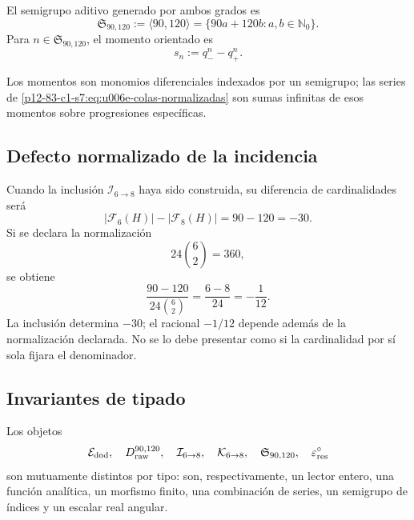 {\begin{definition}
\label{p12-83-c1-s7:def:u006e-semigrupo-momentos}
El semigrupo aditivo generado por ambos grados es
\begin{equation}
 \mathfrak S_{90,120}
 :=\langle90,120\rangle
 =\{90a+120b:a,b\in\mathbb N_0\}.
 \label{p12-83-c1-s7:eq:u006e-semigrupo}
\end{equation}
Para \(n\in\mathfrak S_{90,120}\), el momento orientado es
\begin{equation}
 s_n:=q_-^n-q_+^n.
 \label{p12-83-c1-s7:eq:u006e-momento}
\end{equation}
\end{definition}

Los momentos son monomios diferenciales indexados por un semigrupo; las
series de \eqref{p12-83-c1-s7:eq:u006e-colas-normalizadas} son sumas infinitas de esos
momentos sobre progresiones específicas.

\subsection{Defecto normalizado de la incidencia}

Cuando la inclusión \(\mathcal I_{6\to8}\) haya sido construida, su
diferencia de cardinalidades será
\[
 |\mathcal F_6(H)|-|\mathcal F_8(H)|=90-120=-30.
\]
Si se declara la normalización
\[
 24\binom62=360,
\]
se obtiene
\begin{equation}
 \frac{90-120}{24\binom62}
 =\frac{6-8}{24}
 =-\frac1{12}.
 \label{p12-83-c1-s7:eq:u006e-defecto-normalizado}
\end{equation}
La inclusión determina \(-30\); el racional \(-1/12\) depende además de
la normalización declarada. No se lo debe presentar como si la cardinalidad
por sí sola fijara el denominador.

\subsection{Invariantes de tipado}

\begin{theorem}
\label{p12-83-c1-s7:thm:u006e-separacion-seis-objetos}
Los objetos
\begin{equation}
 \mathcal E_{\rm dod},\quad
 D_{\rm raw}^{90,120},\quad
 \mathcal I_{6\to8},\quad
 \mathcal K_{6\to8},\quad
 \mathfrak S_{90,120},\quad
 \varepsilon_{\rm res}^{\circ}
 \label{p12-83-c1-s7:eq:u006e-seis-objetos}
\end{equation}
son mutuamente distintos por tipo: son, respectivamente, un lector entero,
una función analítica, un morfismo finito, una combinación de series, un
semigrupo de índices y un escalar real angular.
\end{theorem}

}
